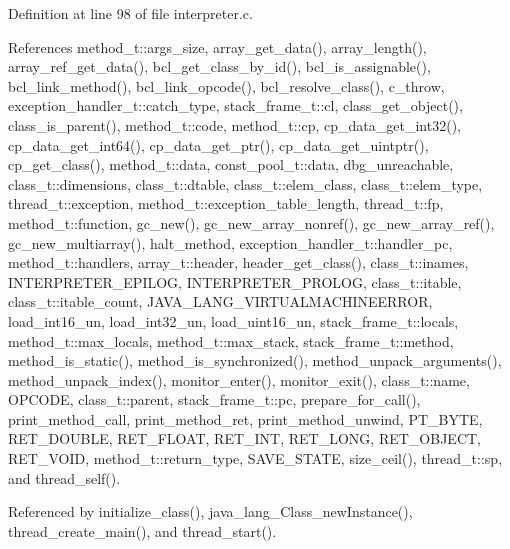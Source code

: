 Definition at line 98 of file interpreter.c.



References method\_\-t::args\_\-size, array\_\-get\_\-data(), array\_\-length(), array\_\-ref\_\-get\_\-data(), bcl\_\-get\_\-class\_\-by\_\-id(), bcl\_\-is\_\-assignable(), bcl\_\-link\_\-method(), bcl\_\-link\_\-opcode(), bcl\_\-resolve\_\-class(), c\_\-throw, exception\_\-handler\_\-t::catch\_\-type, stack\_\-frame\_\-t::cl, class\_\-get\_\-object(), class\_\-is\_\-parent(), method\_\-t::code, method\_\-t::cp, cp\_\-data\_\-get\_\-int32(), cp\_\-data\_\-get\_\-int64(), cp\_\-data\_\-get\_\-ptr(), cp\_\-data\_\-get\_\-uintptr(), cp\_\-get\_\-class(), method\_\-t::data, const\_\-pool\_\-t::data, dbg\_\-unreachable, class\_\-t::dimensions, class\_\-t::dtable, class\_\-t::elem\_\-class, class\_\-t::elem\_\-type, thread\_\-t::exception, method\_\-t::exception\_\-table\_\-length, thread\_\-t::fp, method\_\-t::function, gc\_\-new(), gc\_\-new\_\-array\_\-nonref(), gc\_\-new\_\-array\_\-ref(), gc\_\-new\_\-multiarray(), halt\_\-method, exception\_\-handler\_\-t::handler\_\-pc, method\_\-t::handlers, array\_\-t::header, header\_\-get\_\-class(), class\_\-t::inames, INTERPRETER\_\-EPILOG, INTERPRETER\_\-PROLOG, class\_\-t::itable, class\_\-t::itable\_\-count, JAVA\_\-LANG\_\-VIRTUALMACHINEERROR, load\_\-int16\_\-un, load\_\-int32\_\-un, load\_\-uint16\_\-un, stack\_\-frame\_\-t::locals, method\_\-t::max\_\-locals, method\_\-t::max\_\-stack, stack\_\-frame\_\-t::method, method\_\-is\_\-static(), method\_\-is\_\-synchronized(), method\_\-unpack\_\-arguments(), method\_\-unpack\_\-index(), monitor\_\-enter(), monitor\_\-exit(), class\_\-t::name, OPCODE, class\_\-t::parent, stack\_\-frame\_\-t::pc, prepare\_\-for\_\-call(), print\_\-method\_\-call, print\_\-method\_\-ret, print\_\-method\_\-unwind, PT\_\-BYTE, RET\_\-DOUBLE, RET\_\-FLOAT, RET\_\-INT, RET\_\-LONG, RET\_\-OBJECT, RET\_\-VOID, method\_\-t::return\_\-type, SAVE\_\-STATE, size\_\-ceil(), thread\_\-t::sp, and thread\_\-self().



Referenced by initialize\_\-class(), java\_\-lang\_\-Class\_\-newInstance(), thread\_\-create\_\-main(), and thread\_\-start().

